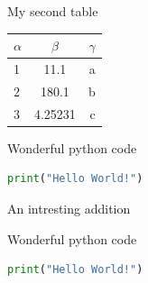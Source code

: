 \documentclass[first=firstname,last=lastname,company=comp,location=Dresden,simple]{baarticle}
\begin{document}
\begin{basimple}
    \lipsum[10]

    \begin{batable}{My second table}
        \begin{tabular}{l|c|r} %
            $\alpha$ & $\beta$ & $\gamma$ \\
            \hline
            1        & 11.1    & a        \\
            2        & 180.1   & b        \\
            3        & 4.25231 & c        \\
        \end{tabular}
    \end{batable}

    \begin{bacode}{Wonderful python code}
        \begin{lstlisting}[language=Python]
print("Hello World!")
\end{lstlisting}
    \end{bacode}

    \clearpage

    \begin{baappx}
        \begin{bafigure}{An intresting addition}
            \lipsum[4]
            \lipsum[4]
        \end{bafigure}
        \begin{bacode}{Wonderful python code}
            \begin{lstlisting}[language=Python]
print("Hello World!")
\end{lstlisting}
        \end{bacode}
    \end{baappx}
\end{basimple}
\end{document}
